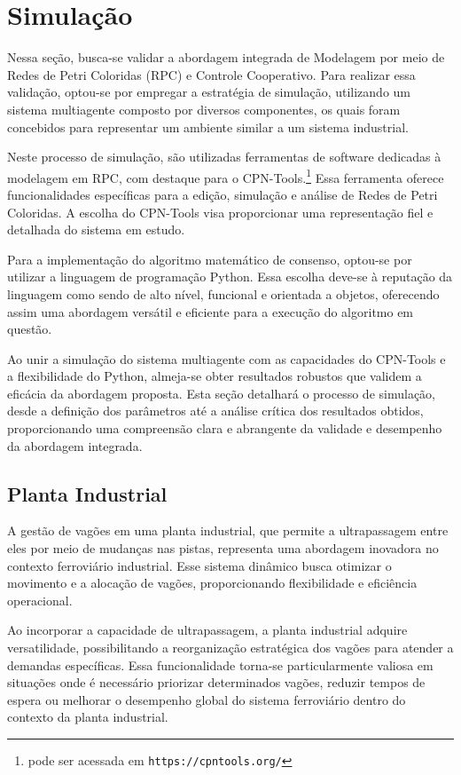 \chapter{Simulação}
\label{chap:simulation}
Nessa seção, busca-se validar a abordagem integrada de Modelagem por meio de Redes de Petri Coloridas (RPC) e Controle Cooperativo. Para realizar essa validação, optou-se por empregar a estratégia de simulação, utilizando um sistema multiagente composto por diversos componentes, os quais foram concebidos para representar um ambiente similar a um sistema industrial.

Neste processo de simulação, são utilizadas ferramentas de software dedicadas à modelagem em RPC, com destaque para o CPN-Tools.\footnote{pode ser acessada em \texttt{https://cpntools.org/}} Essa ferramenta oferece funcionalidades específicas para a edição, simulação e análise de Redes de Petri Coloridas. A escolha do CPN-Tools visa proporcionar uma representação fiel e detalhada do sistema em estudo.

Para a implementação do algoritmo matemático de consenso, optou-se por utilizar a linguagem de programação Python. Essa escolha deve-se à reputação da linguagem como sendo de alto nível, funcional e orientada a objetos, oferecendo assim uma abordagem versátil e eficiente para a execução do algoritmo em questão.

Ao unir a simulação do sistema multiagente com as capacidades do CPN-Tools e a flexibilidade do Python, almeja-se obter resultados robustos que validem a eficácia da abordagem proposta. Esta seção detalhará o processo de simulação, desde a definição dos parâmetros até a análise crítica dos resultados obtidos, proporcionando uma compreensão clara e abrangente da validade e desempenho da abordagem integrada.

\section{Planta Industrial}
A gestão de vagões em uma planta industrial, que permite a ultrapassagem entre eles por meio de mudanças nas pistas, representa uma abordagem inovadora no contexto ferroviário industrial. Esse sistema dinâmico busca otimizar o movimento e a alocação de vagões, proporcionando flexibilidade e eficiência operacional.

Ao incorporar a capacidade de ultrapassagem, a planta industrial adquire versatilidade, possibilitando a reorganização estratégica dos vagões para atender a demandas específicas. Essa funcionalidade torna-se particularmente valiosa em situações onde é necessário priorizar determinados vagões, reduzir tempos de espera ou melhorar o desempenho global do sistema ferroviário dentro do contexto da planta industrial.

